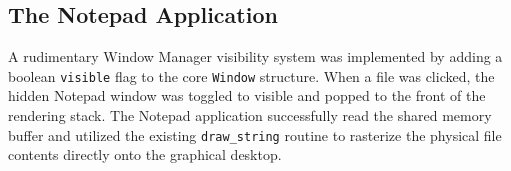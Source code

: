 \documentclass[12pt,a4paper]{report}
\begin{document}
\subsection{The Notepad Application}
A rudimentary Window Manager visibility system was implemented by adding a boolean \texttt{visible} flag to the core \texttt{Window} structure. When a file was clicked, the hidden Notepad window was toggled to visible and popped to the front of the rendering stack. The Notepad application successfully read the shared memory buffer and utilized the existing \texttt{draw\_string} routine to rasterize the physical file contents directly onto the graphical desktop.
\end{document}
